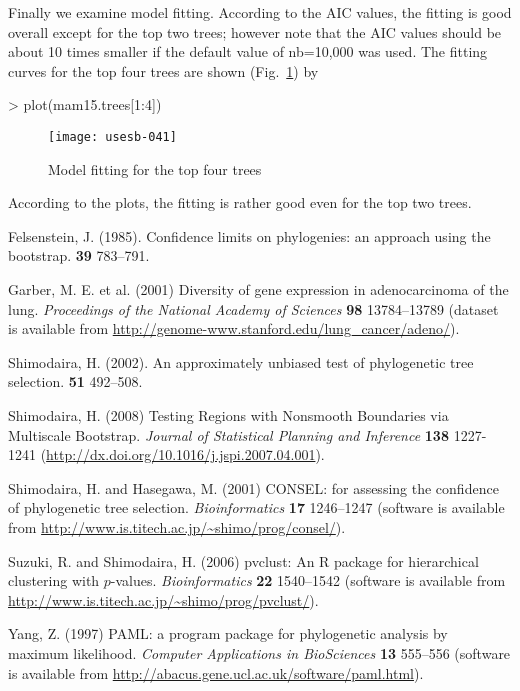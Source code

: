 \documentclass[a4paper]{amsart}
\begin{document}
Finally we examine model fitting.  According to the AIC values, the
fitting is good overall except for the top two trees; however note
that the AIC values should be about 10 times smaller if the default
value of nb=10,000 was used.  The fitting curves for the top four
trees are shown (Fig.~\ref{fig:mamplots}) by
\begin{Schunk}
\begin{Sinput}
> plot(mam15.trees[1:4])
\end{Sinput}
\end{Schunk}
\begin{figure}
\begin{center}
\texttt{[image: usesb-041]}
\caption{Model fitting for the top four trees}\label{fig:mamplots}
\end{center}
\end{figure}
According to the plots, the fitting is rather good even for the top two
trees. 

\begin{thebibliography}{9}

Felsenstein, J.
(1985).
\newblock Confidence limits on phylogenies: an approach using the bootstrap.
 {\bf 39} 783--791.

  Garber, M. E. et al. (2001)
\newblock Diversity of gene expression in adenocarcinoma of the lung.
\newblock \emph{Proceedings of the National Academy of Sciences}
  {\bf 98} 13784--13789 (dataset is available from
  \url{http://genome-www.stanford.edu/lung_cancer/adeno/}).

Shimodaira, H.
(2002).
\newblock An approximately unbiased test of phylogenetic tree selection.
 {\bf 51} 492--508.

Shimodaira, H. (2008)
\newblock Testing Regions with Nonsmooth Boundaries via Multiscale Bootstrap.
\newblock \emph{Journal of Statistical Planning and Inference}
{\bf 138} 1227-1241
(\url{http://dx.doi.org/10.1016/j.jspi.2007.04.001}).

Shimodaira, H. and Hasegawa, M. (2001)
\newblock CONSEL: for assessing the
  confidence of phylogenetic tree selection.
\newblock \emph{Bioinformatics} {\bf 17} 1246--1247 (software is available from
  \url{http://www.is.titech.ac.jp/~shimo/prog/consel/}).

Suzuki, R. and Shimodaira, H. (2006)
\newblock pvclust: An R package for hierarchical clustering with $p$-values.
\newblock \emph{Bioinformatics} {\bf 22} 1540--1542 (software is available from
\url{http://www.is.titech.ac.jp/~shimo/prog/pvclust/}).

Yang, Z. (1997)
\newblock  PAML: a program package for phylogenetic analysis by
  maximum likelihood.
\newblock \emph{Computer Applications in BioSciences}
{\bf 13} 555--556 (software is available from
  \url{http://abacus.gene.ucl.ac.uk/software/paml.html}).


\end{thebibliography}
\end{document}
